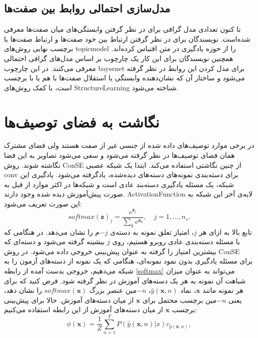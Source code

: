 \subsection{مدل‌سازی احتمالی روابط بین صفت‌ها}
تا کنون تعدادی مدل گرافی برای در نظر گرفتن وابستگی‌های میان صفت‌ها معرفی شده‌است. نویسندگان \cite{topicmodel} برای در نظر گرفتن ارتباط بین خود صفت‌ها و ارتباط صفت‌ها با برچسب نهایی روش‌های 
\gls{topicmodel}
 را از حوزه یادگیری در متن اقتباس کرده‌اند. همچنین  نویسندگان \cite{unified13} برای این کار یک چارچوب بر اساس مدل‌های گرافی احتمالی معرفی می‌کنند. در این چارچوب
\gls{baysenet} 
 برای مدل کردن این روابط در نظر گرفته می‌شود و ساختار آن که نشان‌دهنده وابستگی یا استقلال صفت‌ها با هم یا با برچسب است، با کمک روش‌های \gls{StructureLearning}
شناخته می‌شود.

\section{نگاشت به فضای توصیف‌ها}
در برخی موارد توصیف‌های داده شده از جنسی غیر از صفت هستند ولی فضای مشترک همان فضای توصیف‌ها در نظر گرفته می‌شود و سعی می‌شود تصاویر به این فضا نگاشته شوند.
روش \gls{ConSE}
 \cite{convex} 
از چنین نگاشتی استفاده می‌کند.  ابتدا یک شبکه عصبی \gls{conv}  برای دسته‌بندی نمونه‌های دسته‌های دیده‌شده، یادگرفته می‌شود. یادگیری این شبکه، یک مسئله یادگیری دسته‌بند عادی است و شبکه‌ها در اکثر موارد از قبل به صورت پیش‌آموزش دیده شده وجود دارند. \gls{ActivationFunction}
  لایه‌ی آخر این شبکه  به این صورت تعریف می‌شود:
 \begin{equation}
 \label{softmax}
 softmax(\mathbf{z})_j = \frac{e^{\mathbf{z}_j}}{\sum_k e^{\mathbf{z}_k}}, \quad j = 1, \ldots, n_s.
 \end{equation} 
 تابع بالا به ازای هر $j$، امتیاز تعلق نمونه به دسته‌ی $-j$م را نشان می‌دهد. در هنگامی که با مسئله دسته‌بندی عادی روبرو هستیم، روی $j$ بیشینه گرفته می‌شود و دسته‌ای که بیشترین امتیاز را گرفته به عنوان پیش‌بینی خروجی داده می‌شود. در روش ConSE برای مسئله یادگیری بدون نمود نمونه‌ای، هنگامی که یک نمونه از دسته‌های آزمون را به شبکه می‌دهیم، خروجی بدست آمده از رابطه \eqref{softmax} می‌تواند به عنوان میزان شباهت آن نمونه به هر یک دسته‌های آموزش در نظر گرفته شود. 
  فرض کنید که برای هر نمونه مانند $\mathbf{x}$، نماد
 $\hat{y}(\mathbf{x},n)$،
 $-n$مین 
 عنصر بزرگ 
 $softmax(\mathbf{x})$
  را نشان دهد، یعنی $-n$مین برچسب محتمل برای $\mathbf{x}$ از میان دسته‌های آموزش. حالا برای پیش‌بینی برچسب $\mathbf{x}$ از میان دسته‌های آموزش از این رابطه استفاده می‌کنیم:
 \begin{equation}
 \label{eq:conse}
 \phi(\mathbf{x}) = \frac{1}{Z} \sum_{n=1}^T P(\hat{y}(\mathbf{x},n) | x)  c_{\hat{y}(\mathbf{x},n)},
 \end{equation}

